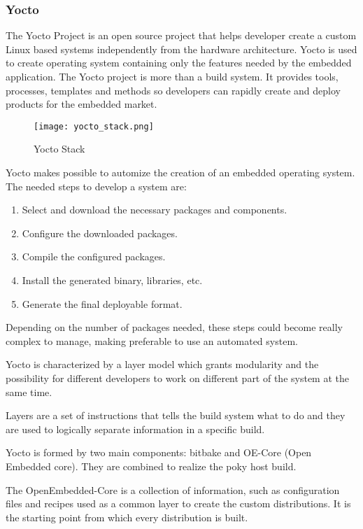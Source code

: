 \subsubsection{Yocto}

The Yocto Project is an open source project that helps developer create a
custom Linux based systems independently from the hardware architecture.
\cite{yocto}
Yocto is used to create operating system containing only the features
needed by the embedded application. 
The Yocto project is more than a build system. It provides tools, processes,
templates and methods so developers can rapidly create and deploy products for
the embedded market.

\begin{figure}[htb]
    \centering
    \texttt{[image: yocto\_stack.png]}
    \caption{Yocto Stack}
    \label{fig:yocto_stack}
\end{figure}

Yocto makes possible to automize the creation of an embedded operating system.
The needed steps to develop a system are:

\begin{enumerate}
    \item   Select and download the necessary packages and components.
    \item   Configure the downloaded packages.
    \item   Compile the configured packages.
    \item   Install the generated binary, libraries, etc.
    \item   Generate the final deployable format.
\end{enumerate}

Depending on the number of packages needed, these steps could become really
complex to manage, making preferable to use an automated system.

Yocto is characterized by a layer model which grants modularity and the
possibility for different developers to work on different part of the system
at the same time.

Layers are a set of instructions that tells the build system what to do
and they are used to logically separate information in a specific build.

Yocto is formed by two main components: bitbake and OE-Core (Open Embedded core).
They are combined to realize the poky host build.

The OpenEmbedded-Core is a collection of information, such as configuration
files and recipes used as a common layer to create the custom distributions.
It is the starting point from which every distribution is built.

